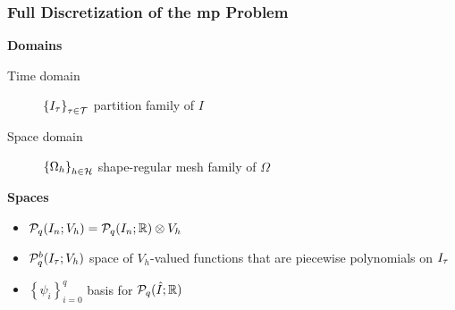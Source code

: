\begin{frame}
    \frametitle{Full Discretization of the \acrshort{mp} Problem}

    \vspace*{\fill}
    \begin{multicols}{2}
        
        \begin{center}
            {\color{\accentcolor} \Large \textbf{Domains}}
            \vspace*{0.5cm}

            \begin{minipage}{0.4\textwidth}
                \begin{description}
                    \item[Time domain] $ \left\{ I_{\tau} \right\}_{\tau \in \mathcal{T}}$ partition family of $I$
                    \item[Space domain] $\left\{ \Omega_{h} \right\}_{h \in \mathcal{H}}$ shape-regular mesh family of $\Omega$
                \end{description}
            \end{minipage}
        \end{center}

        \vfill\null
        \columnbreak

        \begin{center}
            {\color{\accentcolor} \Large \textbf{Spaces}}
            \vspace*{0.5cm}

            \begin{minipage}{0.4\textwidth}
                \begin{itemize}
                    \item $\mathcal{P}_{q}(I_n; V_h) = \mathcal{P}_{q}(I_n; \mathbb{R}) \otimes V_h$
                    \item $\mathcal{P}_{q}^b(I_{\tau}; V_h)$ space of $V_h$-valued functions that are piecewise polynomials on $I_{\tau}$
                    \item $\left\{ \psi_i \right\}_{i = 0}^q$ basis for $\mathcal{P}_{q}(\hat{I}; \mathbb{R})$
                \end{itemize}
            \end{minipage}
        \end{center}

    \end{multicols}


\end{frame}
